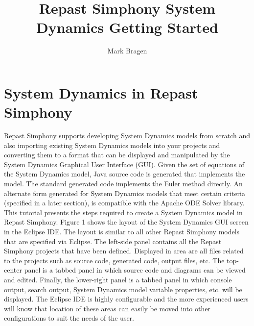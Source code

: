 \documentclass[11pt]{amsart}
\title{Repast Simphony System Dynamics Getting Started}
\author{Mark Bragen}
\begin{document}
 
\maketitle

\section{System Dynamics in Repast Simphony}
Repast Simphony supports developing System Dynamics models from scratch and also importing existing System Dynamics models into your projects and converting them to a format that can be displayed and manipulated by the System Dynamics Graphical User Interface (GUI). Given the set of equations of the System Dynamics model, Java source code is generated that implements the model. The standard generated code implements the Euler method directly. An alternate form generated for System Dynamics models that meet certain criteria (specified in a later section), is compatible with the Apache ODE Solver library.
This tutorial presents the steps required to create a System Dynamics model in Repast Simphony.
Figure 1 shows the layout of the System Dynamics GUI screen in the Eclipse IDE. The layout is similar to all other Repast Simphony models that are specified via Eclipse. The left-side panel contains all the Repast Simphony projects that have been defined. Displayed in area are all files related to the projects such as source code, generated code, output files, etc. The top-center panel is a tabbed panel in which source code and diagrams can be viewed and edited. Finally, the lower-right panel is a tabbed panel in which console output, search output, System Dynamics model variable properties, etc. will be displayed. The Eclipse IDE is highly configurable and the more experienced users will know that location of these areas can easily be moved into other configurations to suit the needs of the user.\\
\end{document}
